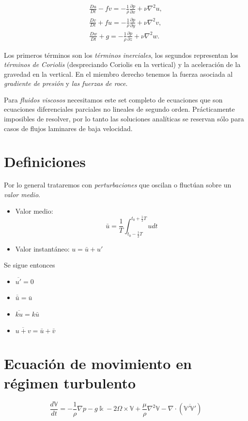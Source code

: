 \documentclass[openany]{book}
\begin{document}
\begin{gather}
   \frac{Du}{Dt}-fv=-\frac{1}{\rho}\frac{\partial p}{\partial x}+\nu\nabla^{2}u,\\
   \frac{Dv}{Dt}+fu=-\frac{1}{\rho}\frac{\partial p}{\partial y}+\nu\nabla^{2}v,\\
   \frac{Dw}{Dt}+g=-\frac{1}{\rho}\frac{\partial p}{\partial z}+\nu\nabla^{2}w.
\end{gather}

\par Los primeros términos son los \emph{términos inerciales},
 los segundos representan los \emph{términos de Coriolis} 
 (despreciando Coriolis en la vertical) y la aceleración de la 
 gravedad en la vertical. En el miembro derecho tenemos la 
 fuerza asociada al \emph{gradiente de presión} y \emph{las 
 fuerzas de roce}.

\par Para \emph{fluidos viscosos} necesitamos este set completo de 
ecuaciones que son ecuaciones diferenciales parciales no lineales de 
segundo orden. Prácticamente imposibles de resolver, por lo tanto las 
soluciones analíticas se reservan sólo para casos de flujos laminares 
de baja velocidad.

\section{Definiciones}
Por lo general trataremos con \emph{perturbaciones} que oscilan o
fluctúan sobre un \emph{valor medio}.
\begin{itemize}
    \item Valor medio: \begin{equation*}
        \bar{u}=\frac{1}{T}\int_{t_0-\frac{1}{2}T}^{t_0+\frac{1}{2}T}udt
    \end{equation*}
    \item Valor instantáneo: $u=\bar{u}+u'$
\end{itemize}
Se sigue entonces
\begin{itemize}
    \item $\overline{u'}=0$
    \item $\overline{\bar{u}}=\bar{u}$
    \item $\overline{ku}=k\bar{u}$
    \item $\overline{u+v}=\bar{u}+\bar{v}$
\end{itemize}

\section{Ecuación de movimiento en régimen turbulento}
\begin{equation}
    \frac{d\mathbb{V}}{dt}=-\frac{1}{\rho}\nabla p-g\Bbbk-2\Omega\times\mathbb{V}+\frac{\mu}{\rho}\nabla^2\mathbb{V}-\nabla\cdot\left(\overline{\mathbb{V}'\mathbb{V}'}\right)
\end{equation}
\end{document}
